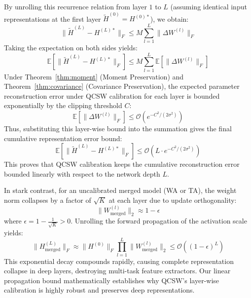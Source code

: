 \documentclass{article}
\theoremstyle{plain}
\theoremstyle{definition}
\theoremstyle{remark}
\begin{document}
By unrolling this recurrence relation from layer $1$ to $L$ (assuming identical input representations at the first layer $\tilde{H}^{(0)} = H^{(0)*}$), we obtain:
\begin{equation}
\|\tilde{H}^{(L)} - H^{(L)*}\|_F \le M \sum_{l=1}^L \|\Delta W^{(l)}\|_F
\end{equation}
Taking the expectation on both sides yields:
\begin{equation}
\mathbb{E}\left[ \|\tilde{H}^{(L)} - H^{(L)*}\|_F \right] \le M \sum_{l=1}^L \mathbb{E}\left[ \|\Delta W^{(l)}\|_F \right]
\end{equation}
Under Theorem~\ref{thm:moment} (Moment Preservation) and Theorem~\ref{thm:covariance} (Covariance Preservation), the expected parameter reconstruction error under QCSW calibration for each layer is bounded exponentially by the clipping threshold $C$:
\begin{equation}
\mathbb{E}\left[ \|\Delta W^{(l)}\|_F \right] \le \mathcal{O}\left( e^{-C^2 / (2\sigma^2)} \right)
\end{equation}
Thus, substituting this layer-wise bound into the summation gives the final cumulative representation error bound:
\begin{equation}
\mathbb{E}\left[ \|\tilde{H}^{(L)} - H^{(L)*}\|_F \right] \le \mathcal{O}\left( L \cdot e^{-C^2 / (2\sigma^2)} \right)
\end{equation}
This proves that QCSW calibration keeps the cumulative reconstruction error bounded linearly with respect to the network depth $L$.

In stark contrast, for an uncalibrated merged model (WA or TA), the weight norm collapses by a factor of $\sqrt{K}$ at each layer due to update orthogonality:
\begin{equation}
\|W^{(l)}_{\text{merged}}\|_2 \approx 1 - \epsilon
\end{equation}
where $\epsilon = 1 - \frac{1}{\sqrt{K}} > 0$. Unrolling the forward propagation of the activation scale yields:
\begin{equation}
\|H^{(L)}_{\text{merged}}\|_F \approx \|H^{(0)}\|_F \prod_{l=1}^L \|W^{(l)}_{\text{merged}}\|_2 \le \mathcal{O}\left( (1 - \epsilon)^L \right)
\end{equation}
This exponential decay compounds rapidly, causing complete representation collapse in deep layers, destroying multi-task feature extractors. Our linear propagation bound mathematically establishes why QCSW's layer-wise calibration is highly robust and preserves deep representations.
\end{document}
